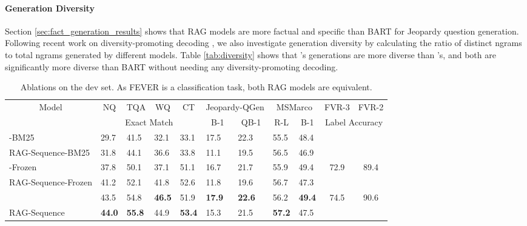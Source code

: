 \documentclass{article}
\begin{document}
\paragraph{Generation Diversity} Section \ref{sec:fact_generation_results} shows that RAG models are more factual and specific than BART for Jeopardy question generation. Following recent work on diversity-promoting decoding  \cite{li-etal-2016-diversity,Vijayakumar2016DiverseBS,massarelli2019decoding}, we also investigate generation diversity by calculating the ratio of distinct ngrams to total ngrams generated by different models. Table \ref{tab:diversity} shows that \raganswer{}'s generations are more diverse than \ragtoken{}'s, and both are significantly more diverse than BART
without needing any diversity-promoting decoding.
\begin{table}[t]

    \centering
    \small
        \caption{Ablations on the dev set. As FEVER is a classification task, both RAG models are equivalent.}
        \vspace{5pt}
    \begin{tabular}{lllll|llll|cc}
    \toprule
         \multicolumn{1}{c}{Model} & \multicolumn{1}{c}{NQ} & \multicolumn{1}{c}{TQA} & \multicolumn{1}{c}{WQ} & \multicolumn{1}{c}{CT} & \multicolumn{2}{c}{Jeopardy-QGen} & \multicolumn{2}{c}{MSMarco} & \multicolumn{1}{c}{FVR-3} & \multicolumn{1}{c}{FVR-2} \\
         \multicolumn{1}{c}{} & \multicolumn{4}{c}{Exact Match} &   \multicolumn{1}{c}{B-1} & \multicolumn{1}{c}{QB-1} &\multicolumn{1}{c}{R-L} & \multicolumn{1}{c}{B-1} & \multicolumn{2}{c}{Label Accuracy} \\
         \midrule
        \ragtoken{}-BM25 & 29.7&	41.5&	32.1&	33.1 & 17.5 &	22.3&	55.5 &	48.4 & \textbf{\multirow{ 2}{*}{75.1}} & \textbf{\multirow{ 2}{*}{91.6}}\\
        RAG-Sequence-BM25 & 31.8&	44.1&	36.6&	33.8 & 11.1	& 19.5	&56.5 &	46.9 \\
        \midrule
        \ragtoken{}-Frozen & 37.8 &	50.1 &	37.1&	51.1 & 16.7	&21.7&	55.9 &	49.4 & \multirow{ 2}{*}{72.9} & \multirow{ 2}{*}{89.4} \\
        RAG-Sequence-Frozen & 41.2	& 52.1&	41.8&	52.6 & 11.8	& 19.6&	56.7 &	47.3 \\
        \midrule
        \ragtoken{} & 43.5&	54.8&	\textbf{46.5}&	51.9 & \textbf{17.9}	& \textbf{22.6} &	56.2&	\textbf{49.4}& \multirow{ 2}{*}{74.5} & \multirow{2}{*}{90.6}\\
        RAG-Sequence & \textbf{44.0}&	\textbf{55.8}&	44.9 &	\textbf{53.4} & 15.3&	21.5 &	\textbf{57.2} &	47.5\\
    \bottomrule
    \end{tabular}

    \label{tab:ablations}
\end{table}
\end{document}
